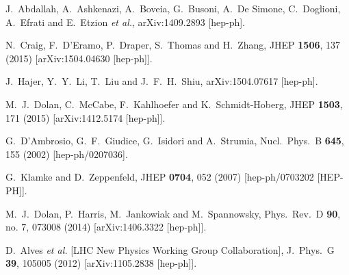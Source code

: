 \documentclass[preprintnumbers,superscriptaddress,nofootinbib,aps,prd,floatfix]{revtex4}
\begin{document}
\begin{thebibliography}{99}
  J.~Abdallah, A.~Ashkenazi, A.~Boveia, G.~Busoni, A.~De Simone, C.~Doglioni, A.~Efrati and E.~Etzion {\it et al.},
  arXiv:1409.2893 [hep-ph].

  N.~Craig, F.~D'Eramo, P.~Draper, S.~Thomas and H.~Zhang,
  JHEP {\bf 1506}, 137 (2015)
  [arXiv:1504.04630 [hep-ph]].

  J.~Hajer, Y.~Y.~Li, T.~Liu and J.~F.~H.~Shiu,
  arXiv:1504.07617 [hep-ph].

  M.~J.~Dolan, C.~McCabe, F.~Kahlhoefer and K.~Schmidt-Hoberg,
  JHEP {\bf 1503}, 171 (2015)
  [arXiv:1412.5174 [hep-ph]].
    
  G.~D'Ambrosio, G.~F.~Giudice, G.~Isidori and A.~Strumia,
  Nucl.\ Phys.\ B {\bf 645}, 155 (2002)
  [hep-ph/0207036].

  G.~Klamke and D.~Zeppenfeld,
  JHEP {\bf 0704}, 052 (2007)
  [hep-ph/0703202 [HEP-PH]].

  M.~J.~Dolan, P.~Harris, M.~Jankowiak and M.~Spannowsky,
  Phys.\ Rev.\ D {\bf 90}, no. 7, 073008 (2014)
  [arXiv:1406.3322 [hep-ph]].

  D.~Alves {\it et al.} [LHC New Physics Working Group Collaboration],
  J.\ Phys.\ G {\bf 39}, 105005 (2012)
  [arXiv:1105.2838 [hep-ph]].
  

\end{thebibliography}
\end{document}
